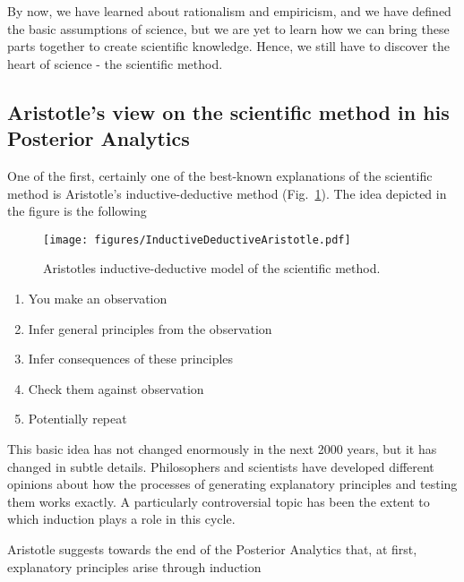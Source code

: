 \documentclass{tufte-book}
\begin{document}
By now, we have learned about rationalism and empiricism, and we have defined the basic assumptions of science, but we are yet to learn how we can bring these parts together to create scientific knowledge. Hence, we still have to discover the heart of science - the scientific method. 

\subsection{Aristotle's view on the scientific method in his Posterior Analytics}


One of the first, certainly one of the best-known explanations of the scientific method is Aristotle's inductive-deductive method (Fig.~\ref{fig: InductiveDeductiveAristotle}). The idea depicted in the figure is the following 

\begin{figure}
\begin{center}
\texttt{[image: figures/InductiveDeductiveAristotle.pdf]}
\caption{Aristotles inductive-deductive model of the scientific method.}
\label{fig: InductiveDeductiveAristotle}
\end{center}
\end{figure}

\begin{enumerate}
\item You make an observation
\item Infer general principles from the observation
\item Infer consequences of these principles
\item Check them against observation
\item Potentially repeat
\end{enumerate}

This basic idea has not changed enormously in the next 2000 years, but it has changed in subtle details. Philosophers and scientists have developed different opinions about how the processes of generating explanatory principles and testing them works exactly. A particularly controversial topic has been the extent to which induction plays a role in this cycle. 

Aristotle suggests towards the end of the Posterior Analytics that, at first, explanatory principles arise through induction
\end{document}
